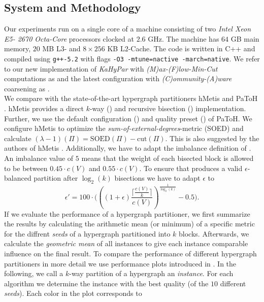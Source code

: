 \subsection{System and Methodology}
\label{sec:methodology}

Our experiments run on a single core of a machine consisting of two \emph{Intel Xeon E5-
2670 Octa-Core} processors clocked at $2.6$ GHz. The machine has $64$ GB main memory,
$20$ MB L$3$- and $8\times256$ KB L$2$-Cache. The code is written in C++ and compiled using
\lstinline{g++-5.2} with flags \lstinline{-O3 -mtune=nactive -march=native}. We refer to
our new implementation of \emph{KaHyPar} with \emph{(M)ax-(F)low-Min-Cut} computations 
as  and the latest configuration with \emph{(C)ommunity-(A)ware} coarsening as
. \\
We compare  with the state-of-the-art hypergraph partitioners hMetis
\cite{karypis1999multilevel,karypis2000multilevel} and PaToH \cite{catalyurek1999hypergraph}.
hMetis provides a direct $k$-way () and recursive bisection () implementation.
Further, we use the default configuration () and quality preset () of
PaToH. We configure hMetis to optimize the \emph{sum-of-external-degrees}-metric
(SOED) and calculate $(\lambda-1)(\Pi) = \text{SOED}(\Pi) - \text{cut}(\Pi)$. This is also
suggested by the authors of hMetis \cite{karypis2000multilevel}. Additionally, we have
to adapt the imbalance definition of . An imbalance value of $5$ means that the weight
of each bisected block is allowed to be between $0.45 \cdot c(V)$ and $0.55 \cdot c(V)$.
To ensure that  produces a valid $\epsilon$-balanced partition after $\log_2(k)$
bisections we have to adapt $\epsilon$ to
\[\epsilon' = 100 \cdot \Bigg( \left( (1 + \epsilon) \frac{\lceil \frac{c(V)}{k} \rceil}{c(V)} \right)^{\frac{1}{\log_2(k)}} - 0.5 \Bigg) \text{.}\]
If we evaluate the performance of a hypergraph partitioner,
we first summarize the results by calculating the arithmetic mean (or minimum) of a specific metric
for the diffrent \emph{seeds} of a hypergraph partitioned into $k$ blocks. 
Afterwards, we calculate the \emph{geometric mean} of 
all instances to give each instance comparable influence on the final result. 
To compare the performance of different hypergraph partitioners in more detail
we use performance plots introduced in \cite{schlag2016k}.
In the following, we call a $k$-way partition of a hypergraph an \emph{instance}.
For each algorithm we determine the instance with the 
best quality (of the $10$ different \emph{seeds}). Each color in the plot corresponds to
